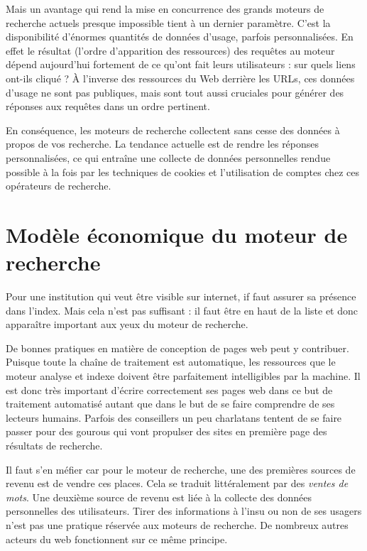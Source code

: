 \documentclass[12pt]{article}
\begin{document}
Mais un avantage qui rend la mise en concurrence des grands moteurs de
recherche actuels presque impossible tient à un dernier
paramètre. C'est la disponibilité d'énormes quantités de données
d'usage, parfois personnalisées. En effet le résultat (l'ordre
d'apparition des ressources) des requêtes au moteur dépend aujourd'hui
fortement de ce qu'ont fait leurs utilisateurs : sur quels liens
ont-ils cliqué ? À l'inverse des ressources du Web derrière les URLs,
ces données d'usage ne sont pas publiques, mais sont tout aussi
cruciales pour générer des réponses aux requêtes dans un ordre pertinent.

En conséquence, les moteurs de recherche collectent sans cesse des
données à propos de vos recherche. La tendance actuelle est de rendre
les réponses personnalisées, ce qui entraîne une collecte de données
personnelles rendue possible à la fois par les techniques de cookies
et l'utilisation de comptes chez ces opérateurs de recherche.

\section*{Modèle économique du moteur de recherche}
\label{sec:orgheadline5}

Pour une institution qui veut être visible sur internet, if faut
assurer sa présence dans l'index. Mais cela n'est pas suffisant : il
faut être en haut de la liste et donc apparaître important aux yeux du
moteur de recherche.

De bonnes pratiques en matière de conception de pages web peut y
contribuer. Puisque toute la chaîne de traitement est automatique, les
ressources que le moteur analyse et indexe doivent être parfaitement
intelligibles par la machine. Il est donc très important d'écrire
correctement ses pages web dans ce but de traitement automatisé autant
que dans le but de se faire comprendre de ses lecteurs
humains. Parfois des conseillers un peu charlatans tentent de se faire
passer pour des gourous qui vont propulser des sites en première page
des résultats de recherche.

Il faut s'en méfier car pour le moteur de recherche, une des premières
sources de revenu est de vendre ces places. Cela se traduit
littéralement par des \emph{ventes de mots}. Une deuxième source de revenu
est liée à la collecte des données personnelles des
utilisateurs. Tirer des informations à l'insu ou non de ses usagers
n'est pas une pratique réservée aux moteurs de recherche. De nombreux
autres acteurs du web fonctionnent sur ce même principe.
\end{document}
